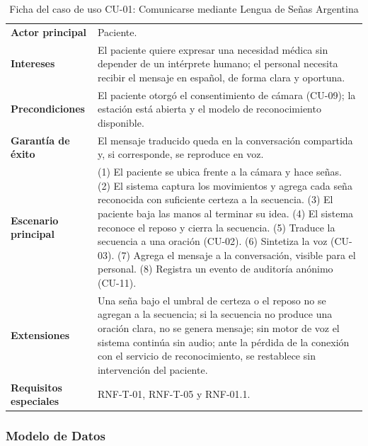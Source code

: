 \begin{table}[H]
  \centering
  \caption{Ficha del caso de uso CU-01: Comunicarse mediante Lengua de Señas Argentina}\label{tab:cu01}
  \small
  \begin{tabularx}{\textwidth}{>{\raggedright\arraybackslash}p{3.3cm} X}
    \toprule
    \textbf{Actor principal} & Paciente. \\
    \textbf{Intereses} & El paciente quiere expresar una necesidad médica sin depender de un intérprete humano; el personal necesita recibir el mensaje en español, de forma clara y oportuna. \\
    \textbf{Precondiciones} & El paciente otorgó el consentimiento de cámara (CU-09); la estación está abierta y el modelo de reconocimiento disponible. \\
    \textbf{Garantía de éxito} & El mensaje traducido queda en la conversación compartida y, si corresponde, se reproduce en voz. \\
    \textbf{Escenario principal} & (1) El paciente se ubica frente a la cámara y hace señas. (2) El sistema captura los movimientos y agrega cada seña reconocida con suficiente certeza a la secuencia. (3) El paciente baja las manos al terminar su idea. (4) El sistema reconoce el reposo y cierra la secuencia. (5) Traduce la secuencia a una oración (CU-02). (6) Sintetiza la voz (CU-03). (7) Agrega el mensaje a la conversación, visible para el personal. (8) Registra un evento de auditoría anónimo (CU-11). \\
    \textbf{Extensiones} & Una seña bajo el umbral de certeza o el reposo no se agregan a la secuencia; si la secuencia no produce una oración clara, no se genera mensaje; sin motor de voz el sistema continúa sin audio; ante la pérdida de la conexión con el servicio de reconocimiento, se restablece sin intervención del paciente. \\
    \textbf{Requisitos especiales} & RNF-T-01, RNF-T-05 y RNF-01.1. \\
    \bottomrule
  \end{tabularx}
\end{table}

\subsubsection{Modelo de Datos}

